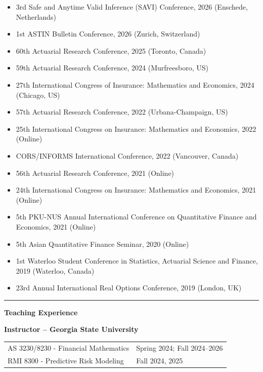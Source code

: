 \documentclass[10pt]{article}
\begin{document}
\begin{itemize}
  \item 3rd Safe and Anytime Valid Inference (SAVI) Conference, 2026 (Enschede, Netherlands)
  \item 1st ASTIN Bulletin Conference, 2026 (Zurich, Switzerland)
  \item 60th Actuarial Research Conference, 2025 (Toronto, Canada)
  \item 59th Actuarial Research Conference, 2024 (Murfreesboro, US)
  \item 27th International Congress of Insurance: Mathematics and Economics, 2024 (Chicago, US)
  \item 57th Actuarial Research Conference, 2022 (Urbana-Champaign, US)
  \item 25th International Congress on Insurance: Mathematics and Economics, 2022 (Online)
  \item CORS/INFORMS International Conference, 2022 (Vancouver, Canada)
  \item 56th Actuarial Research Conference, 2021 (Online)
  \item 24th International Congress on Insurance: Mathematics and Economics, 2021 (Online)
  \item 5th PKU-NUS Annual International Conference on Quantitative Finance and Economics, 2021 (Online)
  \item 5th Asian Quantitative Finance Seminar, 2020 (Online)
  \item 1st Waterloo Student Conference in Statistics, Actuarial Science and Finance, 2019 (Waterloo, Canada)
  \item 23rd Annual International Real Options Conference, 2019 (London, UK)
\end{itemize}

\rule[4pt]{17cm}{0.3pt}
\medskip
{\large \bf Teaching Experience}
\medskip
\nopagebreak[4]

{\bf Instructor -- Georgia State University}

\begin{center}
\renewcommand{\arraystretch}{1.5}%
\begin{tabular}{>{\raggedright}m{13cm}>{\raggedleft\arraybackslash} m{3.5cm}}
AS 3230/8230 - Financial Mathematics & Spring 2024; Fall 2024--2026\\
RMI 8300 - Predictive Risk Modeling & Fall 2024, 2025\\
\end{tabular}
\end{center}
\end{document}
